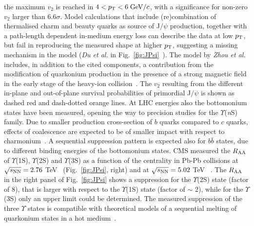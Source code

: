 the maximum $v_2$ is reached in $4 < p_{\rm T} < 6\; \mathrm{GeV}/c$, with a 
significance for non-zero $v_2$ larger than $6.6\sigma$. Model calculations 
that include (re)combination of thermalised charm and beauty quarks as 
source of J$/\psi$ production, together with a path-length dependent in-medium 
energy loss can describe the data at low $p_{\rm T}$, but fail in 
reproducing the measured shape at higher $p_{\rm T}$, suggesting a missing mechanism in the 
model ({\it Du et al.} in Fig.~\ref{fig:JPsi}~\cite{Du:2015wha}). The model by 
{\it Zhou et al.}~\cite{Zhou:2014kka} includes, in addition to the cited components, 
a contribution from the modification of quarkonium production in the presence 
of a strong magnetic field in the early stage of the heavy-ion collision~\cite{Guo:2015nsa}. 
The $v_2$ resulting from the different in-plane and out-of-plane survival 
probabilities of primordial J$/\psi$ is shown as dashed red and dash-dotted 
orange lines. At LHC energies also the bottomonium states have been 
measured, opening the way to precision studies for the $\Upsilon$({\it n}S) 
family. Due to smaller production cross-section of $b$ quarks compared to $c$ quarks, 
effects of coalescence are
expected to be of smaller impact with respect to charmonium~\cite{Andronic:2015wma}. 
A sequential suppression pattern is expected also for $b\bar{b}$ states, due to 
different binding energies of the bottomonium states. CMS measured 
the $R_{\rm AA}$ of $\Upsilon$(1S), $\Upsilon$(2S) and $\Upsilon$(3S) as a 
function of the centrality in Pb-Pb collisions at 
$\sqrt{s_{\rm NN}} = 2.76$ TeV~\cite{Khachatryan:2016xxp} (Fig.~\ref{fig:JPsi}, right) and at 
$\sqrt{s_{\rm NN}} = 5.02$ TeV~	\cite{Sirunyan:2017lzi}. The $R_{\rm AA}$ in the right panel of Fig.~\ref{fig:JPsi} shows a 
suppression for the $\Upsilon$(2S) state (factor of 8), that is larger with 
respect to the $\Upsilon$(1S) state (factor of $\sim$ 2), while for 
the $\Upsilon$(3S) only an upper limit could be determined.
The measured suppression of the three $\Upsilon$ states is compatible 
with theoretical models of a sequential melting of quarkonium states in a 
hot medium~\cite{Khachatryan:2016xxp}.
